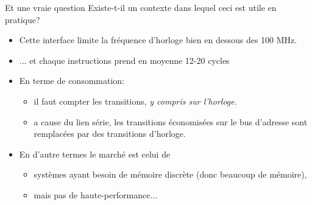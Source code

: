 \documentclass[slidetop,11pt,table]{beamer}
\begin{document}
\begin{frame}{Et une vraie question}
  Existe-t-il un contexte dans lequel ceci est utile en pratique?
  \begin{itemize}
  \item Cette interface limite la fréquence d'horloge bien en dessous des 100 MHz.
  \item ... et chaque instructions prend en moyenne 12-20 cycles
  \item En terme de consommation:
    \begin{itemize}
    \item il faut compter les transitions, \emph{y compris sur
        l'horloge}.
  
  \item a cause du lien série, les transitions économisées sur le bus d'adresse sont remplacées par  des transitions d'horloge. 
  \end{itemize}
  
\item En d'autre termes le marché est celui de
  \begin{itemize}
  \item systèmes ayant besoin de mémoire discrète (donc beaucoup de mémoire),  
  \item mais pas de haute-performance...
\end{itemize}

  \end{itemize}

  
\end{frame}
\end{document}
